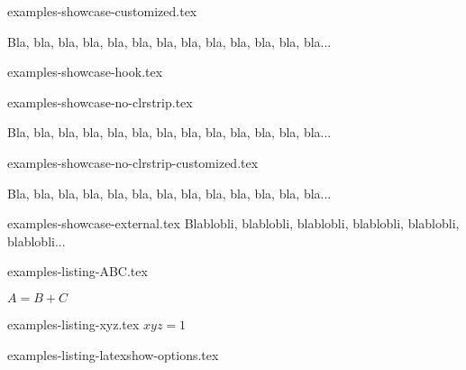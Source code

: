 \begin{filecontents*}{examples-showcase-customized.tex}
\begin{bdocshowcase}[before = Mon début,   
                     after  = Ma fin à moi,
                     color  = red]
    Bla, bla, bla, bla, bla, bla, bla, bla, bla, bla, bla, bla, bla...
\end{bdocshowcase}
\end{filecontents*}


\begin{filecontents*}{examples-showcase-hook.tex}
\begin{bdocshowcase}
\end{bdocshowcase}
\end{filecontents*}


\begin{filecontents*}{examples-showcase-no-clrstrip.tex}
\begin{bdocshowcase}[nostripe]
    Bla, bla, bla, bla, bla, bla, bla, bla, bla, bla, bla, bla, bla...
\end{bdocshowcase}
\end{filecontents*}


\begin{filecontents*}{examples-showcase-no-clrstrip-customized.tex}
\begin{bdocshowcase}[nostripe,
                     before = Mon début,
                     after  = Ma fin à moi,
                     color  = green]
    Bla, bla, bla, bla, bla, bla, bla, bla, bla, bla, bla, bla, bla...
\end{bdocshowcase}
\end{filecontents*}


\begin{filecontents*}{examples-showcase-external.tex}
Blablobli, blablobli, blablobli, blablobli, blablobli, blablobli...
\end{filecontents*}


\begin{filecontents*}{examples-listing-ABC.tex}
\begin{bdoclatex}[sbs]
    $A = B + C$
\end{bdoclatex}
\end{filecontents*}


\begin{filecontents*}{examples-listing-xyz.tex}
$x y z = 1$
\end{filecontents*}


\begin{filecontents*}{examples-listing-latexshow-options.tex}
\end{filecontents*}


